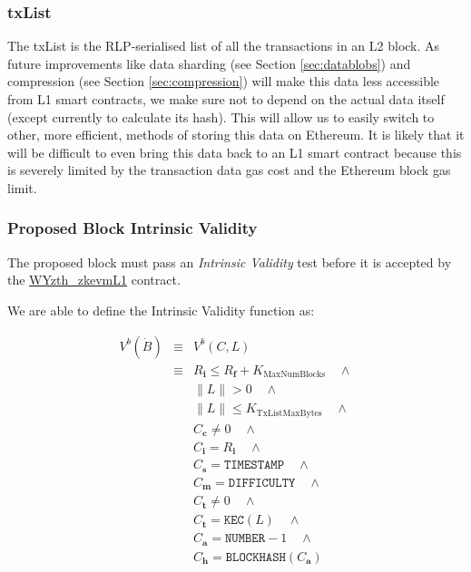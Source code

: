 \documentclass[9pt,oneside]{amsart}
\begin{document}
\begin{multicols}{2}
\subsubsection{txList}\label{sec:txlist}
The txList is the RLP-serialised list of all the transactions in an L2 block. As future improvements like data sharding (see Section \ref{sec:datablobs}) and compression (see Section \ref{sec:compression}) will make this data less accessible from L1 smart contracts, we make sure not to depend on the actual data itself (except currently to calculate its hash). This will allow us to easily switch to other, more efficient, methods of storing this data on Ethereum. It is likely that it will be difficult to even bring this data back to an L1 smart contract because this is severely limited by the transaction data gas cost and the Ethereum block gas limit.

\subsubsection{Proposed Block Intrinsic Validity}
The proposed block must pass an \emph{Intrinsic Validity} test before it is accepted by the \underline{WYzth_zkevmL1} contract. 

We are able to define the Intrinsic Validity function as:

\begin{eqnarray}
V^{b}(\dot{B}) & \equiv &   V^{b}(C,L)  \\
\nonumber & \equiv &   R_\mathbf{i} \le R_\mathbf{f} + K_\mathrm{MaxNumBlocks}   \quad \wedge \\
\nonumber& & \lVert L \rVert > 0 \quad \wedge \\
\nonumber & & \lVert L \rVert \le K_{\mathrm{TxListMaxBytes}} \quad \wedge \\
\nonumber& & C_{\mathbf{c}} \ne 0   \quad \wedge \\
\nonumber& & C_{\mathbf{i}} = R_\mathbf{i}   \quad \wedge \\
\nonumber& & C_{\mathbf{s}} = \texttt{TIMESTAMP}   \quad \wedge \\
\nonumber& & C_{\mathbf{m}} = \texttt{DIFFICULTY}   \quad \wedge \\
\nonumber& & C_{\mathbf{t}} \ne 0   \quad \wedge \\
\nonumber& & C_{\mathbf{t}} = \texttt{KEC}(L)   \quad \wedge \\
\nonumber& & C_{\mathbf{a}} = \texttt{NUMBER} - 1   \quad \wedge \\
\nonumber& & C_{\mathbf{h}} = \texttt{BLOCKHASH}(C_{\mathbf{a}})
\end{eqnarray}


\end{multicols}
\end{document}
